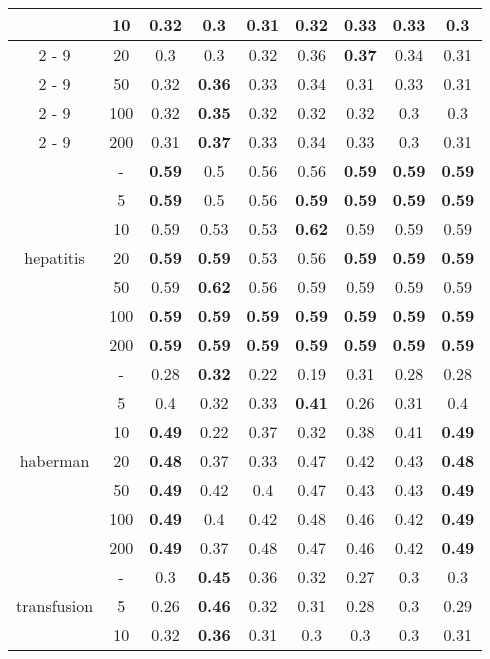 \documentclass{article}%
\begin{document}
\begin{longtable}{c|c|ccccccc}
&10&0.32&0.3&0.31&0.32&\textbf{0.33}&\textbf{0.33}&0.3\\%
\cline{2%
-%
9}%
&20&0.3&0.3&0.32&0.36&\textbf{0.37}&0.34&0.31\\%
\cline{2%
-%
9}%
&50&0.32&\textbf{0.36}&0.33&0.34&0.31&0.33&0.31\\%
\cline{2%
-%
9}%
&100&0.32&\textbf{0.35}&0.32&0.32&0.32&0.3&0.3\\%
\cline{2%
-%
9}%
&200&0.31&\textbf{0.37}&0.33&0.34&0.33&0.3&0.31\\%
\hline%
\multirow{7}{*}{hepatitis}&{-}&\textbf{0.59}&0.5&0.56&0.56&\textbf{0.59}&\textbf{0.59}&\textbf{0.59}\\%
\cline{2%
-%
9}%
&5&\textbf{0.59}&0.5&0.56&\textbf{0.59}&\textbf{0.59}&\textbf{0.59}&\textbf{0.59}\\%
\cline{2%
-%
9}%
&10&0.59&0.53&0.53&\textbf{0.62}&0.59&0.59&0.59\\%
\cline{2%
-%
9}%
&20&\textbf{0.59}&\textbf{0.59}&0.53&0.56&\textbf{0.59}&\textbf{0.59}&\textbf{0.59}\\%
\cline{2%
-%
9}%
&50&0.59&\textbf{0.62}&0.56&0.59&0.59&0.59&0.59\\%
\cline{2%
-%
9}%
&100&\textbf{0.59}&\textbf{0.59}&\textbf{0.59}&\textbf{0.59}&\textbf{0.59}&\textbf{0.59}&\textbf{0.59}\\%
\cline{2%
-%
9}%
&200&\textbf{0.59}&\textbf{0.59}&\textbf{0.59}&\textbf{0.59}&\textbf{0.59}&\textbf{0.59}&\textbf{0.59}\\%
\hline%
\multirow{7}{*}{haberman}&{-}&0.28&\textbf{0.32}&0.22&0.19&0.31&0.28&0.28\\%
\cline{2%
-%
9}%
&5&0.4&0.32&0.33&\textbf{0.41}&0.26&0.31&0.4\\%
\cline{2%
-%
9}%
&10&\textbf{0.49}&0.22&0.37&0.32&0.38&0.41&\textbf{0.49}\\%
\cline{2%
-%
9}%
&20&\textbf{0.48}&0.37&0.33&0.47&0.42&0.43&\textbf{0.48}\\%
\cline{2%
-%
9}%
&50&\textbf{0.49}&0.42&0.4&0.47&0.43&0.43&\textbf{0.49}\\%
\cline{2%
-%
9}%
&100&\textbf{0.49}&0.4&0.42&0.48&0.46&0.42&\textbf{0.49}\\%
\cline{2%
-%
9}%
&200&\textbf{0.49}&0.37&0.48&0.47&0.46&0.42&\textbf{0.49}\\%
\hline%
\multirow{7}{*}{transfusion}&{-}&0.3&\textbf{0.45}&0.36&0.32&0.27&0.3&0.3\\%
\cline{2%
-%
9}%
&5&0.26&\textbf{0.46}&0.32&0.31&0.28&0.3&0.29\\%
\cline{2%
-%
9}%
&10&0.32&\textbf{0.36}&0.31&0.3&0.3&0.3&0.31\\%

\end{longtable}
\end{document}
